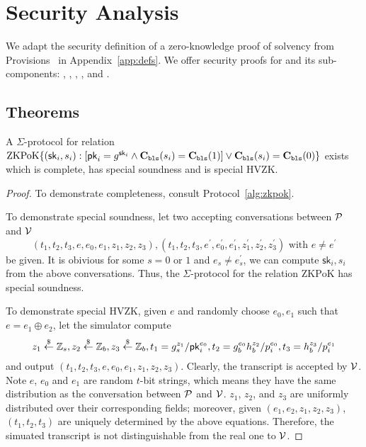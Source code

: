 \chapter{Security Analysis}
\label{sec:proof}

We adapt the security definition of a zero-knowledge proof of solvency from Provisions~\cite{provisions} in Appendix~\ref{app:defs}. We offer security proofs for \Sys and its sub-components: \bootstrap, \userproof, \pol, \poa, and \pos.

\section{Theorems}


\begin{theorem}
\label{thm:sigmaclaim}
A $\Sigma$-protocol for relation $\mathrm{ZKPoK}\{(\mathsf{sk}_i,s_i):[\mathsf{pk}_i=g^{\mathsf{sk}_i}\land{\textbf{C}_\texttt{bls}(s_i)}=\textbf{C}_\texttt{bls}(1)] \lor{\textbf{C}_\texttt{bls}(s_i)}=\textbf{C}_\texttt{bls}(0)\}$ exists which is complete, has special soundness and is special HVZK. 
\end{theorem}

\begin{proof}
To demonstrate completeness, consult Protocol~\ref{alg:zkpok}.

To demonstrate special soundness, let two accepting conversations between $\mathcal{P}$ and $\mathcal{V}$
$$
(t_1,t_2,t_3,e,e_0,e_1,z_1,z_2,z_3),(t_1,t_2,t_3,e^\prime,e_0^\prime,e_1^\prime,z_1^\prime,z_2^\prime,z_3^\prime)\text{ with $e\ne{e^\prime}$}
$$
be given. It is obivious for some $s=0$ or $1$ and $e_s\ne{e_s^\prime}$, we can compute $\mathsf{sk}_i,s_i$ from the above conversations. Thus, the $\Sigma$-protocol for the relation $\mathrm{ZKPoK}$ has special soundness.

To demonstrate special HVZK, given $e$ and randomly choose $e_0,e_1$ such that $e=e_1\oplus{e_2}$, let the simulator compute
$$
z_1\stackrel{\$}{\leftarrow}\mathbb{Z}_s,z_2\stackrel{\$}{\leftarrow}\mathbb{Z}_b,z_3\stackrel{\$}{\leftarrow}\mathbb{Z}_b,t_1=g_s^{z_1}/\mathsf{pk}_i^{e_0},t_2=g_b^{e_0}h_b^{z_2}/{p_i^{e_0}},t_3=h_b^{z_3}/{p_i^{e_1}}
$$
and output $(t_1,t_2,t_3,e,e_0,e_1,z_1,z_2,z_3)$. Clearly, the transcript is accepted by $\mathcal{V}$. Note $e$, $e_0$ and $e_1$ are random $t$-bit strings, which means they have the same distribution as the conversation between $\mathcal{P}$ and $\mathcal{V}$. $z_1$, $z_2$, and $z_3$ are uniformly distributed over their corresponding fields; moreover, given $(e_1,e_2,z_1,z_2,z_3)$, $(t_1,t_2,t_3)$ are uniquely determined by the above equations. Therefore, the simuated transcript is not distinguishable from the real one to $\mathcal{V}$.
\end{proof}

